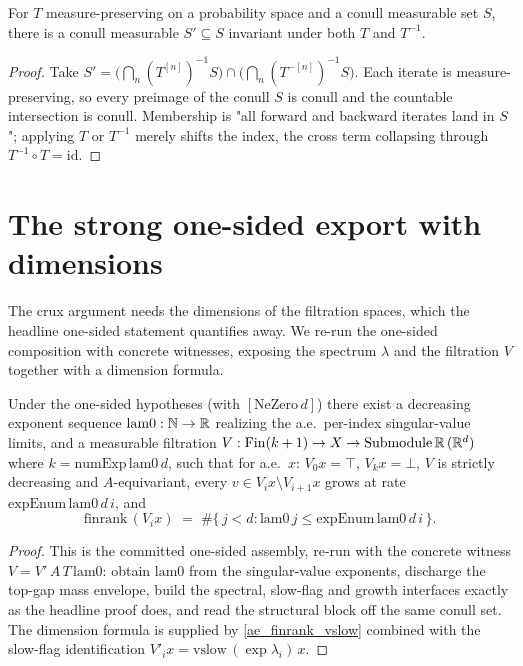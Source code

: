 \begin{lemma}\label{exists_conull_biinvariant}
  For \(T\) measure-preserving on a probability space and a conull measurable set \(S\), there is a conull measurable \(S' \subseteq S\) invariant under both \(T\) and \(T^{-1}\).
\end{lemma}
\begin{proof}
  Take \(S' = \bigl(\bigcap_n (T^{[n]})^{-1}S\bigr) \cap \bigl(\bigcap_n (T^{-[n]})^{-1}S\bigr)\). Each iterate is measure-preserving, so every preimage of the conull \(S\) is conull and the countable intersection is conull. Membership is "all forward and backward iterates land in \(S\)"; applying \(T\) or \(T^{-1}\) merely shifts the index, the cross term collapsing through \(T^{-1}\circ T = \mathrm{id}\).
\end{proof}

\section{The strong one-sided export with dimensions}

The crux argument needs the dimensions of the filtration spaces, which the headline one-sided statement quantifies away. We re-run the one-sided composition with concrete witnesses, exposing the spectrum \(\lambda\) and the filtration \(V\) together with a dimension formula.

\begin{proposition}\label{oseledets_filtration_dims}
  \leanok
  Under the one-sided hypotheses (with \([\mathrm{NeZero}\,d]\)) there exist a decreasing exponent sequence \(\mathrm{lam0} : \mathbb{N} \to \mathbb{R}\) realizing the a.e.\ per-index singular-value limits, and a measurable filtration \(V : \mathrm{Fin}(k+1) \to X \to \mathrm{Submodule}\,\mathbb{R}\,(\mathbb{R}^d)\) where \(k = \mathrm{numExp}\,\mathrm{lam0}\,d\), such that for a.e.\ \(x\): \(V_0 x = \top\), \(V_k x = \bot\), \(V\) is strictly decreasing and \(A\)-equivariant, every \(v \in V_{i}x \setminus V_{i+1}x\) grows at rate \(\mathrm{expEnum}\,\mathrm{lam0}\,d\,i\), and
  \[
    \mathrm{finrank}\,(V_{i}x) \;=\; \#\{\, j < d : \mathrm{lam0}\,j \le \mathrm{expEnum}\,\mathrm{lam0}\,d\,i \,\}.
  \]
\end{proposition}
\begin{proof}\leanok
  This is the committed one-sided assembly, re-run with the concrete witness \(V = V'\,A\,T\,\mathrm{lam0}\): obtain \(\mathrm{lam0}\) from the singular-value exponents, discharge the top-gap mass envelope, build the spectral, slow-flag and growth interfaces exactly as the headline proof does, and read the structural block off the same conull set. The dimension formula is supplied by \cref{ae_finrank_vslow} combined with the slow-flag identification \(V'_i x = \mathrm{vslow}\,(\exp\lambda_i)\,x\).
\end{proof}

